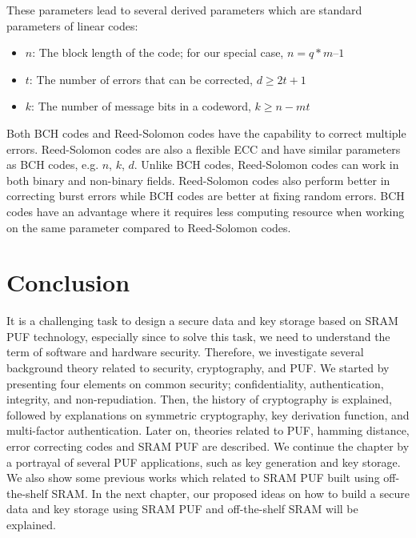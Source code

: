 These parameters lead to several derived parameters which are standard parameters of linear codes:
\begin{itemize}
\item $n$: The block length of the code; for our special case, $n = q*m – 1$
\item $t$: The number of errors that can be corrected, $d \geq 2t + 1$
\item $k$: The number of message bits in a codeword, $k \geq n - mt$
\end{itemize}

Both BCH codes and Reed-Solomon codes have the capability to correct multiple errors. Reed-Solomon codes are also a flexible ECC and have similar parameters as BCH codes, e.g. $n$, $k$, $d$.  Unlike BCH codes, Reed-Solomon codes can work in both binary and non-binary fields. Reed-Solomon codes also perform better in correcting burst errors while BCH codes are better at fixing random errors. BCH codes have an advantage where it requires less computing resource when working on the same parameter compared to Reed-Solomon codes.



\section{Conclusion}
It is a challenging task to design a secure data and key storage based on SRAM PUF technology, especially since to solve this task, we need to understand the term of software and hardware security. Therefore, we investigate several background theory related to security, cryptography, and PUF. We started by presenting four elements on common security; confidentiality, authentication, integrity, and non-repudiation. Then, the history of cryptography is explained, followed by explanations on symmetric cryptography, key derivation function, and multi-factor authentication.
Later on, theories related to PUF, hamming distance, error correcting codes and SRAM PUF are described. We continue the chapter by a portrayal of several PUF applications, such as key generation and key storage. We also show some previous works which related to SRAM PUF built using off-the-shelf SRAM. In the next chapter, our proposed ideas on how to build a secure data and key storage using SRAM PUF and off-the-shelf SRAM will be explained.
